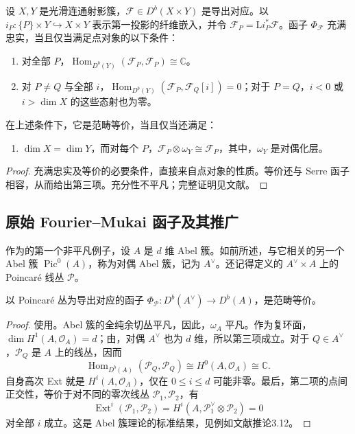 \begin{theorem}\label{thm:4.76}
设 $X,Y$ 是光滑连通射影簇，$\mathcal{F}\in D^b(X\times Y)$ 是导出对应。以 $i_P\colon\{P\}\times Y\hookrightarrow X\times Y$ 表示第一投影的纤维嵌入，并令 $\mathcal{F}_P=\mathrm{L}i_P^*\mathcal{F}$。函子 $\Phi_{\mathcal{F}}$ 充满忠实，当且仅当满足点对象的以下条件：
\begin{enumerate}[label=(\arabic*)]
\item 对全部 $P$，$\operatorname{Hom}_{D^b(Y)}(\mathcal{F}_P,\mathcal{F}_P)\cong\mathbb{C}$。
\item 对 $P\ne Q$ 与全部 $i$，$\operatorname{Hom}_{D^b(Y)}(\mathcal{F}_P,\mathcal{F}_Q[i])=0$；对于 $P=Q$，$i<0$ 或 $i>\dim X$ 的这些态射也为零。
\end{enumerate}
在上述条件下，它是范畴等价，当且仅当还满足：
\begin{enumerate}[label=(\arabic*),start=3]
\item $\dim X=\dim Y$，而对每个 $P$，$\mathcal{F}_P\otimes\omega_Y\cong\mathcal{F}_P$，其中，$\omega_Y$ 是对偶化层。
\end{enumerate}
\end{theorem}
\begin{proof}
充满忠实及等价的必要条件，直接来自点对象的性质。等价还与 Serre 函子相容，从而给出第三项。充分性不平凡；完整证明见文献。\BookQED
\end{proof}

\subsection{原始 Fourier--Mukai 函子及其推广}\label{sec:4.6.4}

作为的第一个非平凡例子，设 $A$ 是 $d$ 维 Abel 簇。如前所述，与它相关的另一个 Abel 簇 $\operatorname{Pic}^0(A)$，称为对偶 Abel 簇，记为 $A^{\vee}$。还记得定义的 $A^{\vee}\times A$ 上的 Poincar\'e 线丛 $\mathcal{P}$。

\begin{theorem}\label{thm:4.77}
以 Poincar\'e 丛为导出对应的函子 $\Phi_{\mathcal{P}}\colon D^b(A^{\vee})\to D^b(A)$，是范畴等价。
\end{theorem}
\begin{proof}
使用。Abel 簇的全纯余切丛平凡，因此，$\omega_A$ 平凡。作为复环面，$\dim H^1(A,\mathcal{O}_A)=d$；由，对偶 $A^{\vee}$ 也为 $d$ 维，所以第三项成立。对于 $Q\in A^{\vee}$，$\mathcal{P}_Q$ 是 $A$ 上的线丛，因而
\[
\operatorname{Hom}_{D^b(A)}(\mathcal{P}_Q,\mathcal{P}_Q)
\cong H^0(A,\mathcal{O}_A)\cong\mathbb{C}.
\]
自身高次 Ext 就是 $H^i(A,\mathcal{O}_A)$，仅在 $0\le i\le d$ 可能非零。最后，第二项的点间正交性，等价于对不同的零次线丛 $\mathcal{P}_1,\mathcal{P}_2$，有
\[
\operatorname{Ext}^i(\mathcal{P}_1,\mathcal{P}_2)
=H^i(A,\mathcal{P}_1^{\vee}\otimes\mathcal{P}_2)=0
\]
对全部 $i$ 成立。这是 Abel 簇理论的标准结果，见例如文献推论3.12。\BookQED
\end{proof}

